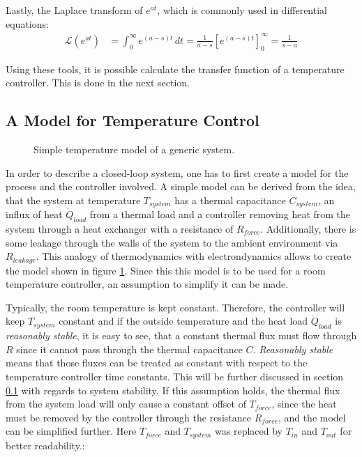 Lastly, the Laplace transform of $e^{at}$, which is commonly used in differential equations:
\begin{align}
    \mathscr{L}\left(e^{at} \right) &= \int_0^\infty e^{(a-s)t}\,dt = \frac{1}{a-s} \left[e^{(a-s)t} \right]_0^\infty = \frac{1}{s-a} \label{eqn:laplace_exponential}
\end{align}


Using these tools, it is possible calculate the transfer function of a temperature controller. This is done in the next section.

\subsection{A Model for Temperature Control}
\begin{figure}[ht]
    \centering
    \caption{Simple temperature model of a generic system.}
    \label{fig:first_order_model_room}
\end{figure}

In order to describe a closed-loop system, one has to first create a model for the process and the controller involved. A simple model can be derived from the idea, that the system at temperature $T_{system}$ has a thermal capacitance $C_{system}$, an influx of heat $\dot Q_{load}$ from a thermal load and a controller removing heat from the system through a heat exchanger with a resistance of $R_{force}$. Additionally, there is some leakage through the walls of the system to the ambient environment via $R_{leakage}$. This analogy of thermodynamics with electrondynamics allows to create the model shown in figure \ref{fig:first_order_model_room}. Since this this model is to be used for a room temperature controller, an assumption to simplify it can be made.

Typically, the room temperature is kept constant. Therefore, the controller will keep $T_{system}$ constant and if the outside temperature and the heat load $\dot Q_{load}$ is \textit{reasonably stable}, it is easy to see, that a constant thermal flux must flow through $R$ since it cannot pass through the thermal capacitance $C$. \textit{Reasonably stable} means that those fluxes can be treated as constant with respect to the temperature controller time constants. This will be further discussed in section \ref{} with regards to system stability. If this assumption holds, the thermal flux from the system load will only cause a constant offset of $T_{force}$, since the heat must be removed by the controller through the resistance $R_{force}$, and the model can be simplified further. Here $T_{force}$ and $T_{system}$ was replaced by $T_{in}$ and $T_{out}$ for better readability.:

